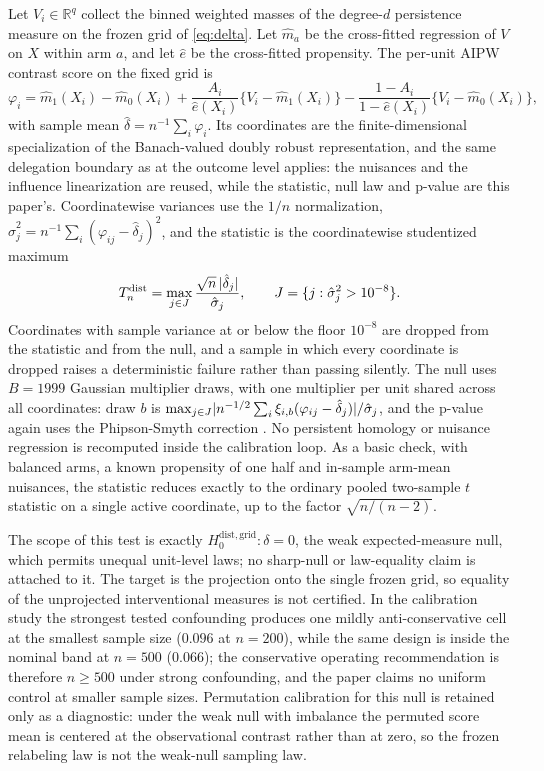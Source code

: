 Let $V_i \in \mathbb R^q$ collect the binned weighted masses of the degree-$d$ persistence measure
on the frozen grid of \eqref{eq:delta}. Let $\hat m_a$ be the cross-fitted regression of $V$ on
$X$ within arm $a$, and let $\hat e$ be the cross-fitted propensity. The per-unit AIPW contrast
score on the fixed grid is
\begin{equation}
\label{eq:distscores}
\varphi_i = \hat m_1(X_i) - \hat m_0(X_i)
+ \frac{A_i}{\hat e(X_i)}\bigl\{V_i - \hat m_1(X_i)\bigr\}
- \frac{1-A_i}{1-\hat e(X_i)}\bigl\{V_i - \hat m_0(X_i)\bigr\},
\end{equation}
with sample mean $\hat\delta = n^{-1}\sum_i \varphi_i$. Its coordinates are the finite-dimensional
specialization of the Banach-valued doubly robust representation, and the same delegation
boundary as at the outcome level applies: the nuisances and the influence linearization are
reused, while the statistic, null law and p-value are this paper's. Coordinatewise variances use
the $1/n$ normalization,
$\hat\sigma_j^2 = n^{-1}\sum_i (\varphi_{ij} - \hat\delta_j)^2$, and the statistic is the
coordinatewise studentized maximum
\begin{equation}
\label{eq:tndist}
T_n^{\mathrm{dist}} = \max_{j \in J} \frac{\sqrt n \, \lvert \hat\delta_j\rvert}{\hat\sigma_j},
\qquad
J = \{j : \hat\sigma_j^2 > 10^{-8}\}.
\end{equation}
Coordinates with sample variance at or below the floor $10^{-8}$ are dropped from the statistic
and from the null, and a sample in which every coordinate is dropped raises a deterministic
failure rather than passing silently. The null uses $B=1999$ Gaussian multiplier draws, with one
multiplier per unit shared across all coordinates: draw $b$ is
$\max_{j \in J} \lvert n^{-1/2}\sum_i \xi_{i,b}(\varphi_{ij} - \hat\delta_j)\rvert/\hat\sigma_j$, and the
p-value again uses the Phipson-Smyth correction \cite{cck_2013,phipson_smyth_2010}. No persistent
homology or nuisance regression is recomputed inside the calibration loop. As a basic check, with
balanced arms, a known propensity of one half and in-sample arm-mean nuisances, the statistic
reduces exactly to the ordinary pooled two-sample $t$ statistic on a single active coordinate, up
to the factor $\sqrt{n/(n-2)}$.

The scope of this test is exactly $H_0^{\mathrm{dist,grid}} : \delta = 0$, the weak
expected-measure null, which permits unequal unit-level laws; no sharp-null or law-equality claim
is attached to it. The target is the projection onto the single frozen grid, so equality of the
unprojected interventional measures is not certified. In the calibration study the strongest
tested confounding produces one mildly anti-conservative cell at the smallest sample size
($0.096$ at $n=200$), while the same design is inside the nominal band at $n=500$ ($0.066$); the
conservative operating recommendation is therefore $n \ge 500$ under strong confounding, and the
paper claims no uniform control at smaller sample sizes. Permutation calibration for this null is
retained only as a diagnostic: under the weak null with imbalance the permuted score mean is
centered at the observational contrast rather than at zero, so the frozen relabeling law is not
the weak-null sampling law.

